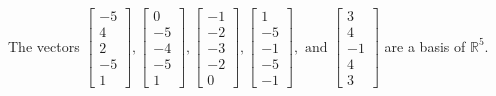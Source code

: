\begin{exercise}
\begin{exerciseStatement}
  \end{exerciseStatement}
  \begin{exerciseAnswer}
   The vectors \(\left[\begin{array}{r}
-5 \\
4 \\
2 \\
-5 \\
1
\end{array}\right] , \left[\begin{array}{r}
0 \\
-5 \\
-4 \\
-5 \\
1
\end{array}\right] , \left[\begin{array}{r}
-1 \\
-2 \\
-3 \\
-2 \\
0
\end{array}\right] , \left[\begin{array}{r}
1 \\
-5 \\
-1 \\
-5 \\
-1
\end{array}\right] , \text{ and } \left[\begin{array}{r}
3 \\
4 \\
-1 \\
4 \\
3
\end{array}\right]\) 
  	 are  a basis of \(\mathbb{R}^5\).
  


  \end{exerciseAnswer}
\end{exercise}